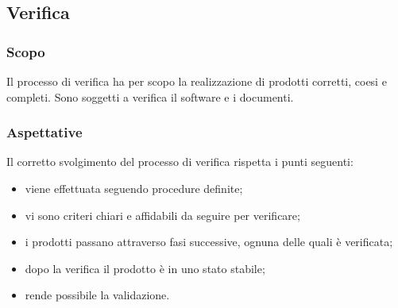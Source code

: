 \subsection{Verifica}
	\subsubsection{Scopo}
	Il processo di verifica ha per scopo la realizzazione di prodotti corretti, coesi e completi. Sono soggetti a verifica il software e i documenti. 
	\subsubsection{Aspettative}
	Il corretto svolgimento del processo di verifica rispetta i punti seguenti:	
	\begin{itemize}
		\item viene effettuata seguendo procedure definite;
		\item vi sono criteri chiari e affidabili da seguire per verificare;
		\item i prodotti passano attraverso fasi successive, ognuna delle quali è verificata;
		\item dopo la verifica il prodotto è in uno stato stabile;
		\item rende possibile la validazione.
	\end{itemize}
